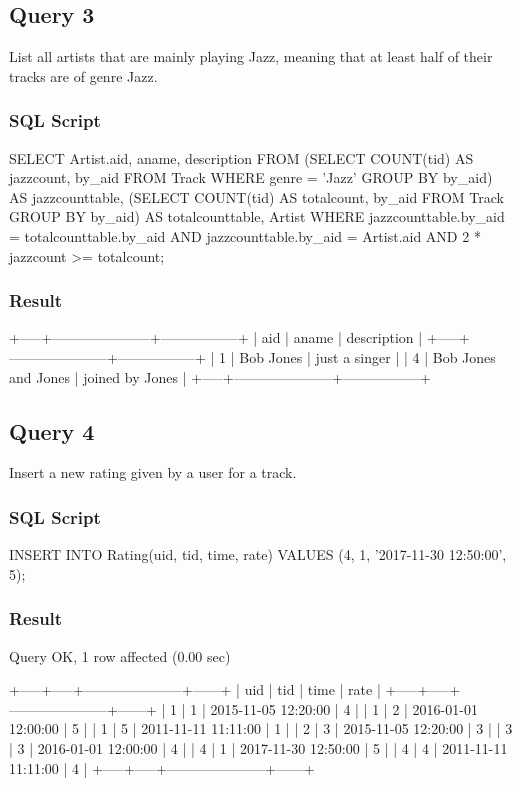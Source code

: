 \documentclass[letterpaper, 12pt]{report}
\begin{document}
	\subsection{Query 3}
	List all artists that are mainly playing Jazz, meaning that at least half of their tracks are of genre Jazz.
	\subsubsection{SQL Script}
	\begin{spverbatim}
		SELECT Artist.aid, aname, description FROM
		(SELECT COUNT(tid) AS jazzcount, by_aid
		FROM Track
		WHERE genre = 'Jazz'
		GROUP BY by_aid) AS jazzcounttable,
		(SELECT COUNT(tid) AS totalcount, by_aid
		FROM Track
		GROUP BY by_aid) AS totalcounttable, Artist
		WHERE jazzcounttable.by_aid = totalcounttable.by_aid
		AND jazzcounttable.by_aid = Artist.aid
		AND 2 * jazzcount >= totalcount;
	\end{spverbatim}
	\subsubsection{Result}
	\begin{spverbatim}
		+-----+---------------------+-----------------+
		| aid | aname               | description     |
		+-----+---------------------+-----------------+
		|   1 | Bob Jones           | just a singer   |
		|   4 | Bob Jones and Jones | joined by Jones |
		+-----+---------------------+-----------------+
	\end{spverbatim}
	
	\subsection{Query 4}
	Insert a new rating given by a user for a track.
	\subsubsection{SQL Script}
	\begin{spverbatim}
		INSERT INTO Rating(uid, tid, time, rate) VALUES (4, 1, '2017-11-30 12:50:00', 5);
	\end{spverbatim}
	\subsubsection{Result}
	\begin{spverbatim}
		Query OK, 1 row affected (0.00 sec)
		
		+-----+-----+---------------------+------+
		| uid | tid | time                | rate |
		+-----+-----+---------------------+------+
		|   1 |   1 | 2015-11-05 12:20:00 |    4 |
		|   1 |   2 | 2016-01-01 12:00:00 |    5 |
		|   1 |   5 | 2011-11-11 11:11:00 |    1 |
		|   2 |   3 | 2015-11-05 12:20:00 |    3 |
		|   3 |   3 | 2016-01-01 12:00:00 |    4 |
		|   4 |   1 | 2017-11-30 12:50:00 |    5 |
		|   4 |   4 | 2011-11-11 11:11:00 |    4 |
		+-----+-----+---------------------+------+
	\end{spverbatim}
	
\end{document}

